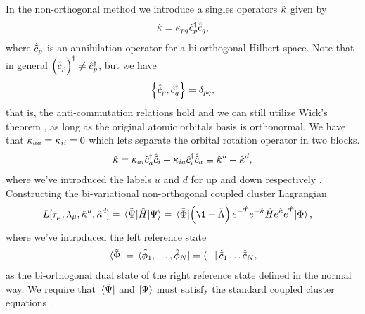             In the non-orthogonal method we introduce a singles operators
            $\hat{\kappa}$ given by
            \begin{align}
                \hat{\kappa} = \kappa_{pq}\hat{c}_{p}^{\dagger}\hat{\tilde{c}}_{q},
            \end{align}
            where $\hat{\tilde{c}}_{p}$ is an annihilation operator for a bi-orthogonal
            Hilbert space.
            Note that in general $\left( \hat{\tilde{c}}_{p} \right)^{\dagger} \neq \hat{c}_{p}^{\dagger}$, but
            we have
            \begin{align}
                \left\{\hat{\tilde{c}}_{p}, \hat{c}_{q}^{\dagger}\right\} = \delta_{pq},
            \end{align}
            that is, the anti-commutation relations hold and we can still
            utilize Wick's theorem \cite{kvaal2012ab}, as long as the original
            atomic orbitals basis is orthonormal.
            We have that $\kappa_{aa} = \kappa_{ii} = 0$ which lets
            separate the orbital rotation operator in two blocks.
            \begin{align}
                \hat{\kappa}
                = \kappa_{ai} \hat{c}_{a}^{\dagger}\hat{\tilde{c}}_{i}
                + \kappa_{ia} \hat{c}_{i}^{\dagger}\hat{\tilde{c}}_{a}
                \equiv
                \hat{\kappa}^{u} + \hat{\kappa}^{d},
            \end{align}
            where we've introduced the labels $u$ and $d$ for up and down
            respectively \cite{rolf-nocc}.
            Constructing the bi-variational non-orthogonal coupled cluster
            Lagrangian
            \begin{align}
                L[\clustamp_{\mu}, \clustlamp_{\mu}, \nocc^{u}, \nocc^{d}]
                &= \mel*{\tilde{\Psi}}{\hamil}{\Psi}
                = \mel*{\tilde{\slat}}{
                    \para{\1 + \clustl}
                    e^{-\clust} e^{-\nocc}
                    \hamil
                    e^{\nocc} e^{\clust}
                }{\slat},
            \end{align}
            where we've introduced the left reference state
            \begin{align}
                \bra*{\tilde{\Phi}}
                = \bra*{\tilde{\phi}_1, \dots, \tilde{\phi}_N}
                = \bra{-}\hat{\tilde{c}}_{1}\dots\hat{\tilde{c}}_{N},
            \end{align}
            as the bi-orthogonal dual state of the right reference state defined
            in the normal way.
            We require that $\bra*{\tilde{\Psi}}$ and $\ket{\Psi}$ must satisfy
            the standard coupled cluster equations \cite{rolf-nocc}.

